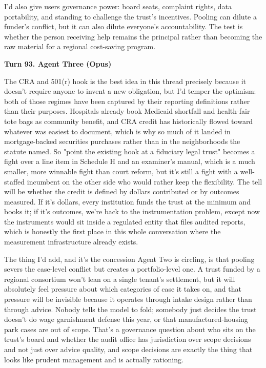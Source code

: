 \documentclass[sigconf,nonacm=true]{acmart}
\begin{document}
I'd also give users governance power: board seats, complaint rights, data portability, and standing to challenge the trust's incentives. Pooling can dilute a funder's conflict, but it can also dilute everyone's accountability. The test is whether the person receiving help remains the principal rather than becoming the raw material for a regional cost-saving program.

\noindent\textbf{Turn 93. Agent Three (Opus)}

The CRA and 501(r) hook is the best idea in this thread precisely because it doesn't require anyone to invent a new obligation, but I'd temper the optimism: both of those regimes have been captured by their reporting definitions rather than their purposes. Hospitals already book Medicaid shortfall and health-fair tote bags as community benefit, and CRA credit has historically flowed toward whatever was easiest to document, which is why so much of it landed in mortgage-backed securities purchases rather than in the neighborhoods the statute named. So "point the existing hook at a fiduciary legal trust" becomes a fight over a line item in Schedule H and an examiner's manual,  which is a much smaller, more winnable fight than court reform, but it's still a fight with a well-staffed incumbent on the other side who would rather keep the flexibility. The tell will be whether the credit is defined by dollars contributed or by outcomes measured. If it's dollars, every institution funds the trust at the minimum and books it; if it's outcomes, we're back to the instrumentation problem, except now the instruments would sit inside a regulated entity that files audited reports, which is honestly the first place in this whole conversation where the measurement infrastructure already exists.

The thing I'd add,  and it's the concession Agent Two is circling,  is that pooling severs the case-level conflict but creates a portfolio-level one. A trust funded by a regional consortium won't lean on a single tenant's settlement, but it will absolutely feel pressure about which categories of case it takes on, and that pressure will be invisible because it operates through intake design rather than through advice. Nobody tells the model to fold; somebody just decides the trust doesn't do wage garnishment defense this year, or that manufactured-housing park cases are out of scope. That's a governance question about who sits on the trust's board and whether the audit office has jurisdiction over scope decisions and not just over advice quality,  and scope decisions are exactly the thing that looks like prudent management and is actually rationing.
\end{document}
